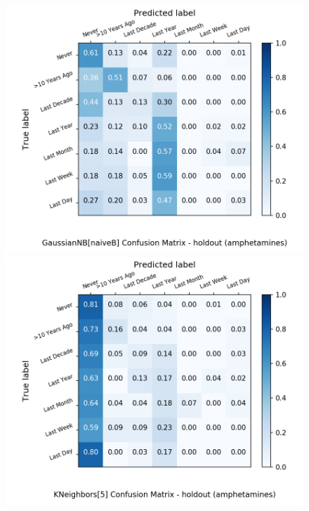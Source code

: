 \begin{figure}[H]
\begin{minipage}[b]{0.32\textwidth}
	\end{minipage}
	\begin{minipage}[b]{0.32\textwidth}
		\includegraphics[width=1.1\textwidth]{Plots/amphetamines_GaussianNB_naiveB_balance_False_holdout.png}
	\end{minipage}
	\begin{minipage}[b]{0.32\textwidth}
		\includegraphics[width=1.1\textwidth]{Plots/amphetamines_KNeighbors_5_balance_False_holdout.png}
  \end{minipage}
	\begin{minipage}[b]{0.32\textwidth}

\end{minipage}
\end{figure}
